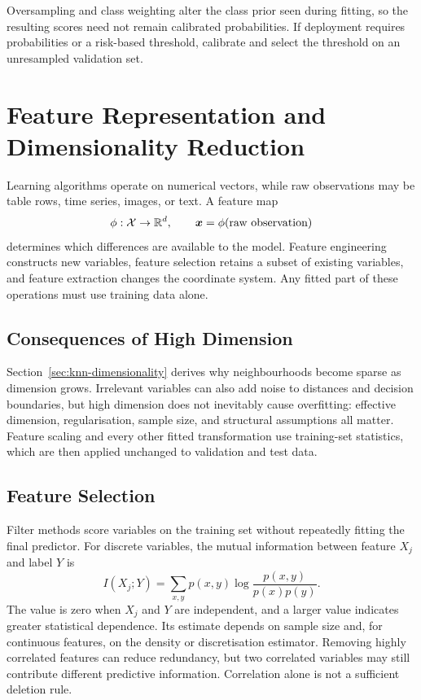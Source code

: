 Oversampling and class weighting alter the class prior seen during fitting, so the resulting scores need not remain calibrated probabilities. If deployment requires probabilities or a risk-based threshold, calibrate and select the threshold on an unresampled validation set.

\section{Feature Representation and Dimensionality Reduction}

Learning algorithms operate on numerical vectors, while raw observations may be table rows, time series, images, or text. A feature map
\[
  \phi:\mathcal X\rightarrow\mathbb{R}^d,
  \qquad
  \bm{x}=\phi(\text{raw observation})
\]
determines which differences are available to the model. Feature engineering constructs new variables, feature selection retains a subset of existing variables, and feature extraction changes the coordinate system. Any fitted part of these operations must use training data alone.

\subsection{Consequences of High Dimension}

Section~\ref{sec:knn-dimensionality} derives why neighbourhoods become sparse
as dimension grows. Irrelevant variables can also add noise to distances and
decision boundaries, but high dimension does not inevitably cause overfitting:
effective dimension, regularisation, sample size, and structural assumptions all
matter. Feature scaling and every other fitted transformation use training-set
statistics, which are then applied unchanged to validation and test data.

\subsection{Feature Selection}

Filter methods score variables on the training set without repeatedly fitting the final predictor. For discrete variables, the mutual information between feature $X_j$ and label $Y$ is
\[
  I(X_j;Y)
  =\sum_{x,y}p(x,y)
    \log\frac{p(x,y)}{p(x)p(y)}.
\]
The value is zero when $X_j$ and $Y$ are independent, and a larger value indicates greater statistical dependence. Its estimate depends on sample size and, for continuous features, on the density or discretisation estimator. Removing highly correlated features can reduce redundancy, but two correlated variables may still contribute different predictive information. Correlation alone is not a sufficient deletion rule.

